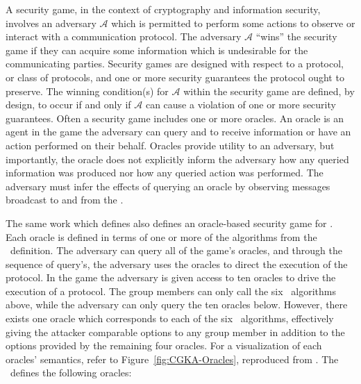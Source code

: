 A security game, in the context of cryptography and information security, involves an adversary \(\mathcal{A}\) which is permitted to perform some actions to observe or interact with a communication protocol.
The adversary \(\mathcal{A}\) ``wins'' the security game if they can acquire some information which is undesirable for the communicating parties.
Security games are designed with respect to a protocol, or class of protocols, and one or more security guarantees the protocol ought to preserve.
The winning condition(s) for \(\mathcal{A}\) within the security game are defined, by design, to occur if and only if \(\mathcal{A}\) can cause a violation of one or more security guarantees.
Often a security game includes one or more oracles.
An oracle is an agent in the game the adversary can query and to receive information or have an action performed on their behalf.
Oracles provide utility to an adversary, but importantly, the oracle does not explicitly inform the adversary how any queried information was produced nor how any queried action was performed.
The adversary must infer the effects of querying an oracle by observing messages broadcast to and from the .

The same work which defines  also defines an oracle-based security game for .
Each oracle is defined in terms of one or more of the algorithms from the \CGKAdef\ definition.
The adversary can query all of the game's oracles, and through the sequence of query's, the adversary uses the oracles to direct the execution of the  protocol.
In the game the adversary is given access to ten oracles to drive the execution of a  protocol.
The group members can only call the six \CGKAdef\ algorithms above, while the adversary can only query the ten oracles below.
However, there exists one oracle which corresponds to each of the six \CGKAdef\ algorithms, effectively giving the attacker comparable options to any group member in addition to the options provided by the remaining four oracles.
For a visualization of each oracles' semantics, refer to Figure\ \ref{fig:CGKA-Oracles}, reproduced from \autocite{alwen2020security}.
The \CGKAsec\ defines the following oracles:

